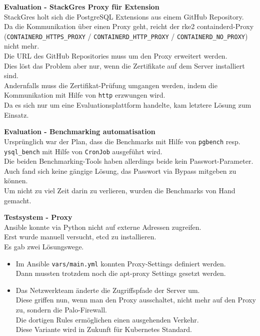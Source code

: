 \begin{flushleft}
\begin{description}
        \item \textbf{Evaluation - StackGres Proxy für Extension}\hfill \\StackGres holt sich die PostgreSQL Extensions aus einem \Gls{GitHub} Repository.\\Da die Kommunikation über einen Proxy geht, reicht der \gls{rke2} containderd-Proxy (\texttt{CONTAINERD\_HTTPS\_PROXY} / \texttt{CONTAINERD\_HTTP\_PROXY} / \texttt{CONTAINERD\_NO\_PROXY}) nicht mehr.\\Die URL des \Gls{GitHub} Repositories muss um den Proxy erweitert werden.\\Dies löst das Problem aber nur, wenn die Zertifikate auf dem Server installiert sind.\\Andernfalls muss die Zertifikat-Prüfung umgangen werden, indem die Kommunikation mit Hilfe von \texttt{http} erzwungen wird.\\Da es sich nur um eine Evaluationsplattform handelte, kam letztere Lösung zum Einsatz.
        \item \textbf{Evaluation - Benchmarking automatisation}\hfill \\Ursprünglich war der Plan, dass die Benchmarks mit Hilfe von \texttt{pgbench} resp. \texttt{ysql\_bench} mit Hilfe von \texttt{CronJob} ausgeführt wird.\\Die beiden Benchmarking-Tools haben allerdings beide kein Passwort-Parameter.\\Auch fand sich keine gängige Lösung, das Passwort via Bypass mitgeben zu können.\\Um nicht zu viel Zeit darin zu verlieren, wurden die Benchmarks von Hand gemacht.
        \item \textbf{Testsystem - Proxy}\hfill \\Ansible konnte via Python nicht auf externe Adressen zugreifen.\\Erst wurde manuell versucht, etcd zu installieren.\\Es gab zwei Lösungswege.
        \begin{itemize}
            \item Im \Gls{Ansible} \texttt{vars/main.yml} konnten Proxy-Settings definiert werden.\\Dann mussten trotzdem noch die apt-proxy Settings gesetzt werden.
            \item Das Netzwerkteam änderte die Zugriffspfade der Server um.\\Diese griffen nun, wenn man den Proxy ausschaltet, nicht mehr auf den Proxy zu, sondern die Palo-Firewall.\\Die dortigen Rules ermöglichen einen ausgehenden Verkehr.\\Diese Variante wird in Zukunft für \Gls{Kubernetes} Standard.
        \end{itemize}
    \end{description}
\end{flushleft}